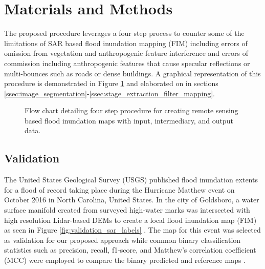 \documentclass{article}
\begin{document}
\section{Materials and Methods}
\label{sec:materials_and_methods}
%
The proposed procedure leverages a four step process to counter some of the limitations of SAR based flood inundation mapping (FIM) including errors of omission from vegetation and anthropogenic feature interference and errors of commission including anthropogenic features that cause specular reflections or multi-bounces such as roads or dense buildings.
A graphical representation of this procedure is demonstrated in Figure \ref{fig:process_flowchart} and elaborated on in sections \ref{ssec:image_segmentation}-\ref{ssec:stage_extraction_filter_mapping}.
%
\begin{figure}[htb]
    \begin{minipage}[b]{1.0\linewidth}
        \centering
        \centerline{}
    \end{minipage}
    \caption{Flow chart detailing four step procedure for creating remote sensing based flood inundation maps with input, intermediary, and output data.}
    \label{fig:process_flowchart}
\end{figure}
%
\subsection{Validation}
\label{ssec:validation}
%
The United States Geological Survey (USGS) published flood inundation extents for a flood of record taking place during the Hurricane Matthew event on October 2016 in North Carolina, United States. 
In the city of Goldsboro, a water surface manifold created from surveyed high-water marks was intersected with high resolution Lidar-based DEMs to create a local flood inundation map (FIM) as seen in Figure \ref{fig:validation_sar_labels} \cite{musser2017characterization}.
The map for this event was selected as validation for our proposed approach while common binary classification statistics such as precision, recall, f1-score, and Matthew's correlation coefficient (MCC) were employed to compare the binary predicted and reference maps \cite{canbek2017binary,matthews1975comparison}.
%
\end{document}
